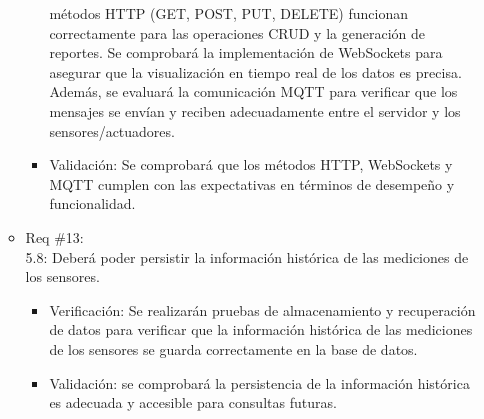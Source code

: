 \begin{itemize}
\begin{itemize}
\begin{itemize}
			                  métodos HTTP (GET, POST, PUT, DELETE) funcionan correctamente para las
			                  operaciones CRUD y la generación de reportes. Se comprobará la implementación
			                  de WebSockets para asegurar que la visualización en tiempo real de los datos es
			                  precisa. Además, se evaluará la comunicación MQTT para verificar que los
			                  mensajes se envían y reciben adecuadamente entre el servidor y los
			                  sensores/actuadores.
			            \item Validación: Se comprobará que los métodos HTTP, WebSockets y MQTT cumplen con
			                  las expectativas en términos de desempeño y funcionalidad.
		            \end{itemize}
		      \item Req \#13: \\ 5.8: Deberá poder persistir la información histórica de las
		            mediciones de los sensores.
		            \begin{itemize}
			            \item Verificación: Se realizarán pruebas de almacenamiento y recuperación de datos
			                  para verificar que la información histórica de las mediciones de los sensores
			                  se guarda correctamente en la base de datos.
			            \item Validación: se comprobará la persistencia de la información histórica es
			                  adecuada y accesible para consultas futuras.
		            \end{itemize}
	      \end{itemize}
\end{itemize}

\pagebreak

